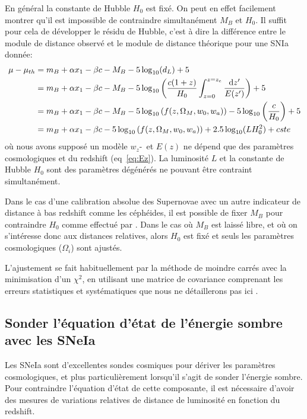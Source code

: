 \documentclass[../main/main.tex]{subfiles}
\begin{document}
En général la constante de Hubble $H_{0}$ est fixé. On peut en effet
facilement montrer qu'il est impossible de contraindre simultanément
$M_{B}$ et $H_{0}$. Il suffit pour cela de développer le résidu de
Hubble, c'est à dire la différence entre le module de distance observé et le
module de distance théorique pour une SNIa donnée:
\begin{align}
  \mu - \mu_{th}&= m_{B}+\alpha x_{1}-\beta c -M_{B}
  -5\log_{10}(d_{L})+5\\
  &=m_{B}+\alpha x_{1}-\beta c - M_{B} -
    5\log_{10}\left(\frac{c(1+z)}{H_{0}}\int_{z=0}^{z=z_{e}}\frac{\mathrm{d} z'}{E(z')}\right) +5 \\
  &= m_{B}+\alpha x_{1}-\beta c - M_{B} -
    5\log_{10}\left(f(z,\Omega_{M},w_{0},w_{a})\right) -
    5\log_{10}\left(\frac{c}{H_{0}}\right) +5\\
  &= m_{B}+\alpha x_{1}-\beta c -
    5\log_{10}\left(f(z,\Omega_{M},w_{0},w_{a})\right)
    +2.5\log_{10}(LH_{0}^{2}) + cste
\end{align}
où nous avons supposé un modèle $w_{z}$-\lcdm\ et $E(z)$ ne dépend que des
paramètres cosmologiques et du redshift (eq~\ref{eq:Ez}). La luminosité
$L$ et la constante de Hubble $H_{0}$ sont des paramètres dégénérés ne
pouvant être contraint simultanément.

Dans le cas d'une calibration absolue des Supernovae avec un autre
indicateur de distance à bas redshift comme les céphéides, il est possible de fixer
$M_{B}$ pour contraindre $H_0$ comme effectué par \citet{Riess2016}. Dans le cas où $M_{B}$ est laissé libre, et où on
s'intéresse donc aux distances relatives, alors $H_{0}$ est fixé et seuls les paramètres
cosmologiques ($\Omega_i$) sont ajustés.

L'ajustement se fait habituellement par la méthode de moindre carrés
avec la minimisation d'un $\chi^{2}$, en utilisant une matrice de
covariance comprenant les erreurs statistiques et systématiques que nous
ne détaillerons pas ici \citep[voir][]{Betoule2014}.

\subsection{Sonder l'équation d'état de l'énergie sombre avec les SNeIa}

Les SNeIa sont d'excellentes sondes cosmiques pour dériver les
paramètres cosmologiques, et plus particulièrement lorsqu'il s'agit de
sonder l'énergie sombre. Pour contraindre l'équation d'état de cette
composante, il est nécessaire d'avoir des mesures de variations
relatives de distance de luminosité en fonction du redshift.
\end{document}
